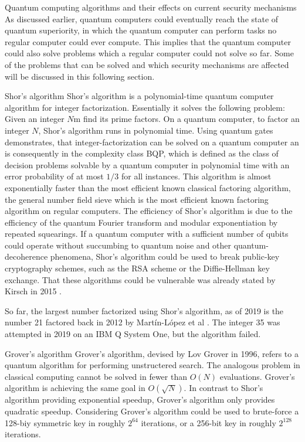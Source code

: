 \documentclass[aps,preprintnumbers,twocolumn]{revtex4}
\begin{document}
\begin{section}{Quantum computing algorithms and their effects on current security mechanisms}
As discussed earlier, quantum computers could eventually reach the state of quantum superiority, 
in which the quantum computer can perform tasks no regular computer could ever compute.
This implies that the quantum computer could also solve problems which a regular computer could not solve so far.
Some of the problems that can be solved and which security mechanisms are affected will be discussed in this following section. 

\begin{subsection}{Shor's algorithm}
Shor's algorithm is a polynomial-time quantum computer algorithm for integer factorization.
Essentially it solves the following problem: 
Given an integer $N$m find its prime factors. 
On a quantum computer, to factor an integer $N$, 
Shor's algorithm runs in polynomial time. 
Using quantum gates demonstrates, 
that integer-factorization can be solved on a quantum computer an is consequently in the complexity class BQP, 
which is defined as the class of decision problems solvable by a quantum computer in polynomial time with an error probability of at most $1/3$ for all instances. 
This algorithm is almost exponentially faster than the most efficient known classical factoring algorithm, the general number field sieve which is the most efficient known factoring algorithm on regular computers. 
The efficiency of Shor's algorithm is due to the efficiency of the quantum Fourier transform and modular exponentiation by repeated squearings. 
If a quantum computer with a sufficient number of qubits could operate without succumbing to quantum noise and other quantum-decoherence phenomena, 
Shor's algorithm could be used to break public-key cryptography schemes, 
such as the RSA scheme or the Diffie-Hellman key exchange. That these algorithms could be vulnerable was already stated by Kirsch in 2015
\cite{Kirsch2015QuantumCT}.

So far, the largest number factorized using Shor's algorithm, 
as of 2019 is the number 21 factored back in 2012 by Martín-López et al \cite{article}. 
The integer 35 was attempted in 2019 on an IBM Q System One, 
but the algorithm failed. 

\end{subsection}

\begin{subsection}{Grover's algorithm}
Grover's algorithm, devised by Lov Grover in 1996,
refers to a quantum algorithm for performing unstructered search. 
The analogous problem in classical computing cannot be solved in fewer than $O(N)$ evaluations. 
Grover's algorithm is achieving the same goal in $O(\sqrt{N})$. 
In contrast to Shor's algorithm providing exponential speedup, 
Grover's algorithm only provides quadratic speedup. 
Considering Grover's algorithm could be used to brute-force a 128-biy symmetric key in roughly $2^{64}$ iterations, 
or a 256-bit key in roughly $2^{128}$ iterations.


\end{subsection}
\end{section}
\end{document}
